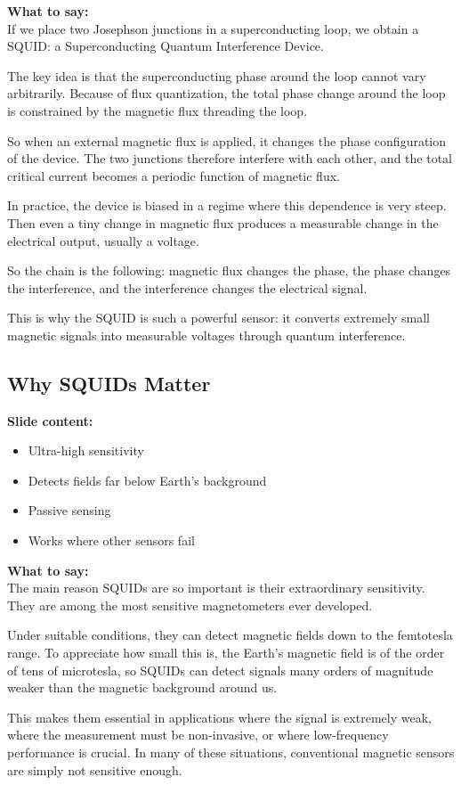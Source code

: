 \documentclass[11pt,a4paper]{article}
\newcommand{\points}[1]{{\color{accent}\textbf{Slide content:}}\\#1}
\newcommand{\speech}[1]{{\color{accent}\textbf{What to say:}}\\#1}
\begin{document}
\speech{
If we place two Josephson junctions in a superconducting loop, we obtain a SQUID: a Superconducting Quantum Interference Device.

The key idea is that the superconducting phase around the loop cannot vary arbitrarily. Because of flux quantization, the total phase change around the loop is constrained by the magnetic flux threading the loop.

So when an external magnetic flux is applied, it changes the phase configuration of the device. The two junctions therefore interfere with each other, and the total critical current becomes a periodic function of magnetic flux.

In practice, the device is biased in a regime where this dependence is very steep. Then even a tiny change in magnetic flux produces a measurable change in the electrical output, usually a voltage.

So the chain is the following: magnetic flux changes the phase, the phase changes the interference, and the interference changes the electrical signal.

This is why the SQUID is such a powerful sensor: it converts extremely small magnetic signals into measurable voltages through quantum interference.
}


\subsection{Why SQUIDs Matter}

\points{
\begin{itemize}
\item Ultra-high sensitivity
\item Detects fields far below Earth's background
\item Passive sensing
\item Works where other sensors fail
\end{itemize}
}

\speech{
The main reason SQUIDs are so important is their extraordinary sensitivity. They are among the most sensitive magnetometers ever developed.

Under suitable conditions, they can detect magnetic fields down to the femtotesla range. To appreciate how small this is, the Earth's magnetic field is of the order of tens of microtesla, so SQUIDs can detect signals many orders of magnitude weaker than the magnetic background around us.

This makes them essential in applications where the signal is extremely weak, where the measurement must be non-invasive, or where low-frequency performance is crucial. In many of these situations, conventional magnetic sensors are simply not sensitive enough.
}
\end{document}
